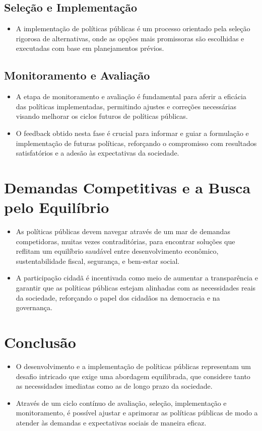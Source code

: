 \documentclass[
   article,       
   12pt,          
   oneside,       
   a4paper,       
   english,       
   brazil,        
   sumario=tradicional
   ]{abntex2}
\begin{document}
\subsection{Seleção e Implementação}
\begin{itemize}
\item A implementação de políticas públicas é um processo orientado pela seleção rigorosa de alternativas, onde as opções mais promissoras são escolhidas e executadas com base em planejamentos prévios.
\end{itemize}
\subsection{Monitoramento e Avaliação}
\begin{itemize}
\item A etapa de monitoramento e avaliação é fundamental para aferir a eficácia das políticas implementadas, permitindo ajustes e correções necessárias visando melhorar os ciclos futuros de políticas públicas.
\item O feedback obtido nesta fase é crucial para informar e guiar a formulação e implementação de futuras políticas, reforçando o compromisso com resultados satisfatórios e a adesão às expectativas da sociedade.
\end{itemize}

\section{Demandas Competitivas e a Busca pelo Equilíbrio}
\begin{itemize}
\item As políticas públicas devem navegar através de um mar de demandas competidoras, muitas vezes contraditórias, para encontrar soluções que reflitam um equilíbrio saudável entre desenvolvimento econômico, sustentabilidade fiscal, segurança, e bem-estar social.
\item A participação cidadã é incentivada como meio de aumentar a transparência e garantir que as políticas públicas estejam alinhadas com as necessidades reais da sociedade, reforçando o papel dos cidadãos na democracia e na governança.
\end{itemize}

\section{Conclusão}
\begin{itemize}
\item O desenvolvimento e a implementação de políticas públicas representam um desafio intricado que exige uma abordagem equilibrada, que considere tanto as necessidades imediatas como as de longo prazo da sociedade.
\item Através de um ciclo contínuo de avaliação, seleção, implementação e monitoramento, é possível ajustar e aprimorar as políticas públicas de modo a atender às demandas e expectativas sociais de maneira eficaz.
\end{itemize}
\end{document}
